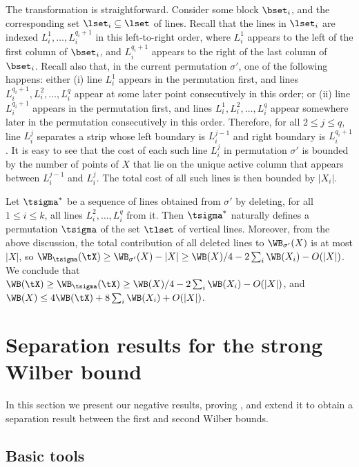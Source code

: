 The transformation is straightforward. Consider some block $\bset_i$, and the corresponding set $\lset_i\subseteq \lset$ of lines.
Recall that the lines in $\lset_i$ are indexed $L^1_i,\ldots,L^{q_i+1}_i$ in this left-to-right order, where $L^1_i$ appears to the left of the first column of $\bset_i$, and $L^{q_i+1}_i$ appears to the right of the last column of $\bset_i$. Recall also that, in the current permutation $\sigma'$, one of the following happens: either (i) line $L^1_i$ appears in the permutation first, and lines $L^{q_i+1}_i,L^2_i,\ldots, L^q_i$ appear at some later point consecutively in this order; or (ii) line $L^{q_i+1}_i$ appears in the permutation first, and lines $L^1_i,L^2_i,\ldots,L^q_i$ appear somewhere later in the permutation consecutively in this order. Therefore, for all $2\leq j\leq q$, line $L_i^j$ separates a strip whose left boundary is $L_i^{j-1}$ and right boundary is $L_i^{q_i+1}$. It is easy to see that the cost of each such line $L_i^j$ in permutation $\sigma'$ is bounded by the number of points of $X$ that lie on the unique active column that appears between $L_i^{j-1}$ and $L_i^j$. The total cost of all such lines is then bounded by $|X_i|$.

Let $\tsigma^*$ be a sequence of lines obtained from $\sigma'$ by deleting, for all $1\leq i\leq k$, all lines $L_i^2,\ldots,L_i^q$ from it. Then $\tsigma^*$ naturally defines a permutation $\tsigma$ of the set $\tlset$ of vertical lines. Moreover, from the above discussion, the total contribution of all deleted lines to $\WB_{\sigma'}(X)$ is at most $|X|$, so $\WB_{\tsigma}(\tX)\geq \WB_{\sigma'}(X)-|X|\geq \WB(X)/4-2\sum_i\WB(X_i)-O(|X|)$. We conclude that $\WB(\tX)\geq \WB_{\tsigma}(\tX)\geq \WB(X)/4-2\sum_i\WB(X_i)-O(|X|)$, and $\WB(X)\leq 4\WB(\tX)+8\sum_i\WB(X_i)+O(|X|)$.


%

\section{Separation results for the strong Wilber bound}
\label{sec: negative}

In this section we present our negative results,  proving , and extend it to obtain a separation result between the first and second Wilber bounds. 

%
%
%
%
%
%
%
%
%
%
%
%
%
%
%
%
%




\subsection{Basic tools}
\label{sec: sequences} 

